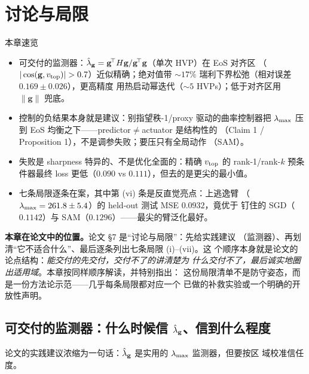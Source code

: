 
\section{讨论与局限}\label{sec:ch10}

\begin{keybox}{本章速览}
\begin{itemize}
  \item 可交付的监测器：$\hat{\lambda}_{\mathbf{g}}=\mathbf{g}^{\!\top}H\mathbf{g}/
        \mathbf{g}^{\!\top}\mathbf{g}$（单次 HVP）在 EoS 对齐区
        （$|\cos(\mathbf{g},\vtope)|>0.7$）近似精确；绝对值带
        ${\sim}17\%$ 瑞利下界松弛（相对误差 $0.169\pm0.026$），更高精度
        用热启动幂迭代（${\sim}5$ HVPs）；低于对齐区用 $\|\mathbf{g}\|$
        兜底。
  \item 控制的负结果本身就是建议：别指望秩-1/proxy 驱动的曲率控制器把
        $\lambda_{\max}$ 压到 EoS 均衡之下——predictor$\ne$actuator 是结构性的
        （Claim 1 / Proposition 1），不是调参失败；要压只有全局动作
        （SAM）。
  \item 失败是 sharpness 特异的、不是优化全面的：精确 $v_{\mathrm{top}}$
        的 rank-1/rank-$k$ 预条件器最终 loss 更低（$0.090$ vs
        $0.111$），但去的是更尖的最小值。
  \item 七条局限逐条在案，其中第 (vi) 条是反直觉亮点：上逃逸臂
        （$\lambda_{\max}=261.8\pm5.4$）的 held-out 测试 MSE $0.0932$，竟优于
        钉住的 SGD（$0.1142$）与 SAM（$0.1296$）——最尖的臂泛化最好。
\end{itemize}
\end{keybox}

\textbf{本章在论文中的位置。}论文 \S7 是“讨论与局限”：先给实践建议
（监测器）、再划清“它不适合什么”、最后逐条列出七条局限 (i)--(vii)。这
个顺序本身就是论文的论点结构：\emph{能交付的先交付，交付不了的讲清楚为
什么交付不了，最后诚实地圈出适用域}。本章按同样顺序解读，并特别指出：
这份局限清单不是防守姿态，而是一份方法论示范——几乎每条局限都对应一个
已做的补救实验或一个明确的开放性声明。

\subsection{可交付的监测器：什么时候信 $\hat{\lambda}_{\mathbf{g}}$、信到什么程度}\label{sec:ch10-monitor}

论文的实践建议浓缩为一句话：$\hat{\lambda}_{\mathbf{g}}$ 是实用的 $\lambda_{\max}$ 监测器，但要按区
域校准信任度。

